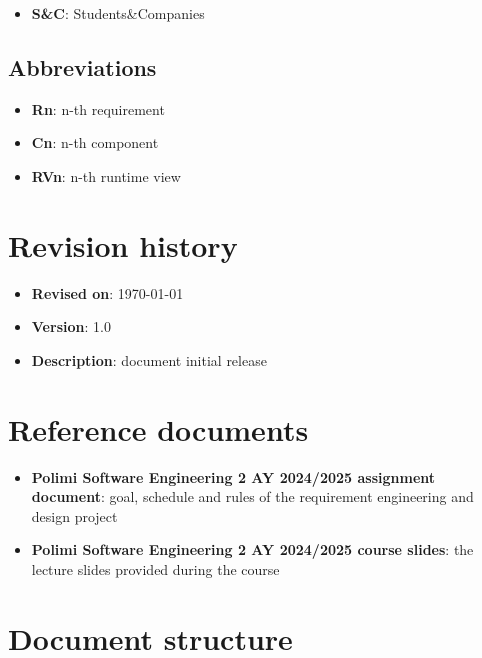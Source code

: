 \begin{itemize}
    \item \textbf{S\&C}: Students\&Companies
\end{itemize}

\subsection{Abbreviations}

\begin{itemize}
    \item \textbf{Rn}: n-th requirement
    \item \textbf{Cn}: n-th component
    \item \textbf{RVn}: n-th runtime view
\end{itemize}

\section{Revision history}

\begin{itemize}
    \item \textbf{Revised on}: \today
    \item \textbf{Version}: 1.0
    \item \textbf{Description}: document initial release
\end{itemize}

\section{Reference documents}

\begin{itemize}
    \item \textbf{Polimi Software Engineering 2 AY 2024/2025 assignment document}: goal, schedule and rules of the requirement engineering and design project
    \item \textbf{Polimi Software Engineering 2 AY 2024/2025 course slides}: the lecture slides provided during the course
\end{itemize}

\section{Document structure}

